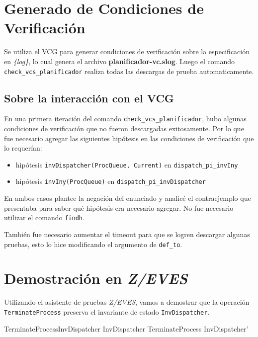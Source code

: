\documentclass{article}
\begin{document}
\section{Generado de Condiciones de Verificación}

Se utiliza el VCG para generar condiciones de verificación sobre la especificación en \textit{\{log\}}, lo cual genera el archivo \textbf{planificador-vc.slog}. Luego el comando \verb|check_vcs_planificador| realiza todas las descargas de prueba automaticamente.

\subsection*{Sobre la interacción con el VCG}

En una primera iteración del comando \verb|check_vcs_planificador|, hubo algunas condiciones de verificación que no fueron descargadas exitosamente. Por lo que fue necesario agregar las siguientes hipótesis en las condiciones de verificación que lo requerían:

\begin{itemize}
    \item hipótesis \verb|invDispatcher(ProcQueue, Current)| en \verb|dispatch_pi_invIny|
    \item hipótesis \verb|invIny(ProcQueue)| en \verb|dispatch_pi_invDispatcher|
\end{itemize}

En ambos casos plantee la negación del enunciado y analicé el contraejemplo que presentaba para saber qué hipótesis era necesario agregar. No fue necesario utilizar el comando \verb|findh|.

También fue necesario aumentar el timeout para que se logren descargar algunas pruebas, esto lo hice modificando el argumento de \verb|def_to|.

\section{Demostración en \textit{Z/EVES}}

Utilizando el asistente de pruebas \textit{Z/EVES}, vamos a demostrar que la operación \verb|TerminateProcess| preserva el invariante de estado \verb|InvDispatcher|.

\begin{theorem}{TerminateProcessInvDispatcher}
    InvDispatcher \land TerminateProcess \implies InvDispatcher'
\end{theorem}
\end{document}
